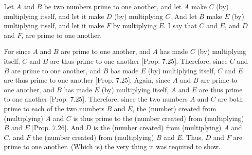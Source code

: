 \begin{Parallel}{}{}
{\epsfysize=2in
\centerline{}

Let $A$ and $B$ be two numbers prime to one another, and let $A$ make
$C$ (by) multiplying itself, and let it make $D$ (by) multiplying $C$. 
And let $B$ make $E$ (by) multiplying itself, and let it make $F$ by multiplying $E$.
I say that $C$ and $E$, and $D$ and $F$, are prime to one another.

For since $A$ and $B$ are prime to one another, and $A$ has made $C$ (by)
multiplying itself, $C$ and $B$ are thus prime to one another [Prop. 7.25]. Therefore, since
$C$ and $B$ are prime to one another, and $B$ has made $E$ (by) multiplying itself,
$C$ and $E$ are thus prime to one another [Prop. 7.25].  Again, since $A$ and $B$ are prime to
one another, and $B$ has made $E$ (by) multiplying itself, $A$ and $E$ are thus
prime to one another [Prop. 7.25]. Therefore,
since the two numbers $A$ and $C$ are both prime to each of the two numbers
$B$ and $E$, the (number) created from (multiplying) $A$ and $C$ is thus
prime to the (number created) from (multiplying) $B$ and $E$ [Prop. 7.26]. And $D$ is the (number created)
from (multiplying) $A$ and $C$, and $F$ the (number created) from (multiplying)
$B$ and $E$. Thus, $D$ and $F$ are prime to one another. (Which is) the 
very thing it
was required to show.}
\end{Parallel}



